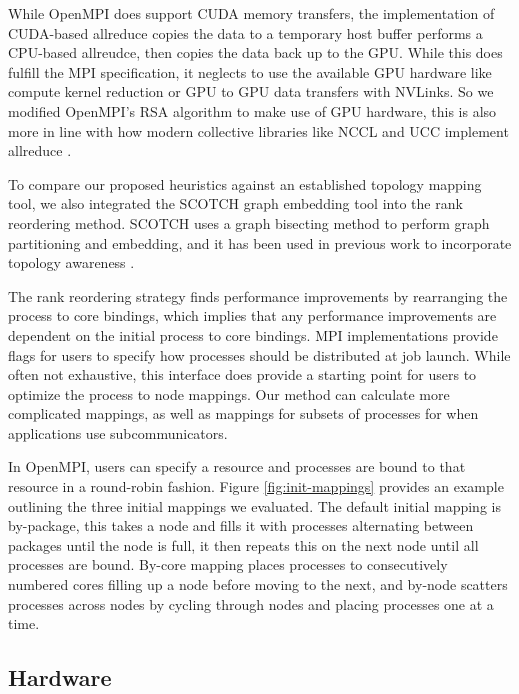While OpenMPI does support CUDA memory transfers, the implementation of CUDA-based allreduce copies the data to a temporary host buffer performs a CPU-based allreudce, then copies the data back up to the GPU.
While this does fulfill the MPI specification, it neglects to use the available GPU hardware like compute kernel reduction or GPU to GPU data transfers with NVLinks.
So we modified OpenMPI's RSA algorithm to make use of GPU hardware, this is also more in line with how modern collective libraries like NCCL and UCC implement allreduce \cite{UCC, NCCL}.

To compare our proposed heuristics against an established topology mapping tool, we also integrated the SCOTCH graph embedding tool \cite{Pellegrini2012SCOTCH} into the rank reordering method.
SCOTCH uses a graph bisecting method to perform graph partitioning and embedding, and it has been used in previous work to incorporate topology awareness \cite{Mirsadeghi2016TopoAwareCollRR}.


The rank reordering strategy finds performance improvements by rearranging the process to core bindings, which implies that any performance improvements are dependent on the initial process to core bindings.
MPI implementations provide flags for users to specify how processes should be distributed at job launch. 
While often not exhaustive, this interface does provide a starting point for users to optimize the process to node mappings.
Our method can calculate more complicated mappings, as well as mappings for subsets of processes for when applications use subcommunicators.  

In OpenMPI, users can specify a resource and processes are bound to that resource in a round-robin fashion.
Figure \ref{fig:init-mappings} provides an example outlining the three initial mappings we evaluated.
The default initial mapping is by-package, this takes a node and fills it with processes alternating between packages until the node is full, it then repeats this on the next node until all processes are bound.
By-core mapping places processes to consecutively numbered cores filling up a node before moving to the next, and by-node scatters processes across nodes by cycling through nodes and placing processes one at a time.

\subsection{Hardware}\label{sec:topo-eval-hardware}

